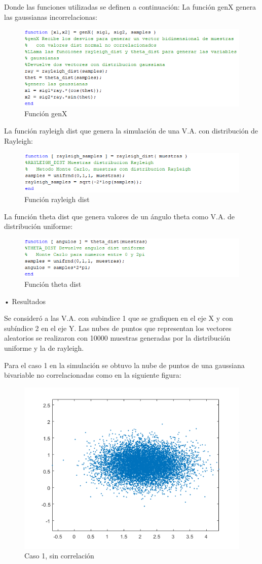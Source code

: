 Donde las funciones utilizadas se definen a continuación:
La función genX genera las gaussianas incorrelacionas:
\begin{figure}[H]
	\centering
	\includegraphics[width=0.6\linewidth]{./ImagenesEjercicio2/genX.PNG}
	\caption{Función genX}
	\label{fig:genX}
\end{figure}

La función rayleigh dist que genera la simulación de una V.A. con distribución de Rayleigh:
\begin{figure}[H]
	\centering
	\includegraphics[width=0.6\linewidth]{./ImagenesEjercicio2/ray.PNG}
	\caption{Función rayleigh dist}
	\label{fig:ray}
\end{figure}

La función theta dist que genera valores de un ángulo theta como V.A. de distribución uniforme:
\begin{figure}[H]
	\centering
	\includegraphics[width=0.6\linewidth]{./ImagenesEjercicio2/theta.PNG}
	\caption{Función theta dist}
	\label{fig:theta}
\end{figure}

\begin{large}

• Resultados\\
\end{large}

Se consideró a las V.A. con subindice 1 que se grafiquen en el eje X y con subíndice 2 en el eje Y. Las nubes de puntos que representan los vectores aleatorios se realizaron con 10000 muestras generadas por la distribución uniforme y la de rayleigh.

Para el caso 1 en la simulación se obtuvo la nube de puntos de una gaussiana bivariable no correlacionadas como en la siguiente figura:

\begin{figure}[H]
	\centering
	\includegraphics[width=0.4\linewidth]{./ImagenesEjercicio2/GaussianaBivariableSinCorr1.PNG}
	\caption{Caso 1, sin correlación}
	\label{fig:G1SC}
\end{figure}

